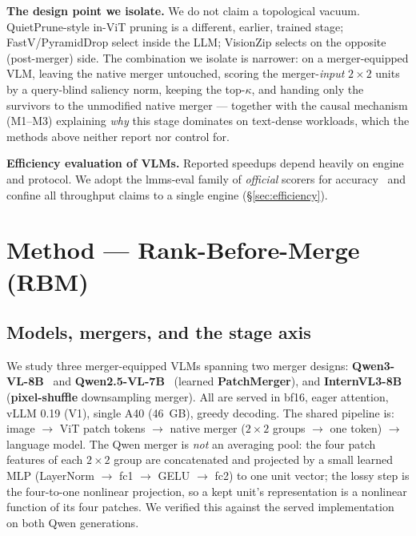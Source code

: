 \documentclass[sigconf,review,anonymous]{acmart}
\begin{document}
\textbf{The design point we isolate.} We do not claim a topological vacuum.
QuietPrune-style in-ViT pruning is a different, earlier, trained stage;
FastV/PyramidDrop select inside the LLM; VisionZip selects on the opposite
(post-merger) side. The combination we isolate is narrower: on a merger-equipped
VLM, leaving the native merger untouched, scoring the merger-\emph{input}
$2\!\times\!2$ units by a query-blind saliency norm, keeping the top-$\kappa$,
and handing only the survivors to the unmodified native merger --- together with
the causal mechanism (M1--M3) explaining \emph{why} this stage dominates on
text-dense workloads, which the methods above neither report nor control for.

\textbf{Efficiency evaluation of VLMs.} Reported speedups depend heavily on
engine and protocol. We adopt the lmms-eval family of \emph{official} scorers
for accuracy~\cite{zhang2024lmmseval} and confine all throughput claims to a
single engine (\S\ref{sec:efficiency}).

\section{Method --- Rank-Before-Merge (RBM)}\label{sec:method}

\subsection{Models, mergers, and the stage axis}\label{sec:models}

We study three merger-equipped VLMs spanning two merger designs:
\textbf{Qwen3-VL-8B}~\cite{bai2025qwen3vl} and
\textbf{Qwen2.5-VL-7B}~\cite{bai2025qwen25vl} (learned
\textbf{PatchMerger}), and \textbf{InternVL3-8B}~\cite{zhu2025internvl3}
(\textbf{pixel-shuffle} downsampling merger). All are served in bf16, eager
attention, vLLM 0.19 (V1), single A40 (46~GB), greedy decoding. The shared
pipeline is: image $\to$ ViT patch tokens $\to$ native merger ($2\!\times\!2$
groups $\to$ one token) $\to$ language model. The Qwen merger is \emph{not} an
averaging pool: the four patch features of each $2\!\times\!2$ group are
concatenated and projected by a small learned MLP (LayerNorm $\to$ fc1 $\to$
GELU $\to$ fc2) to one unit vector; the lossy step is the four-to-one nonlinear
projection, so a kept unit's representation is a nonlinear function of its four
patches. We verified this against the served implementation on both Qwen
generations.
\end{document}
